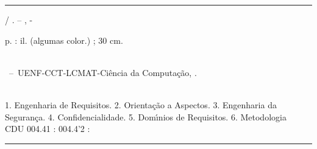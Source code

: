 \documentclass[12pt,oneside,a4paper,english,french,spanish,brazil]{abntex2}
\begin{document}

\frenchspacing

\imprimircapa
\imprimirfolhaderosto*

\begin{fichacatalografica}
	\vspace*{\fill}					%
	\hrule							%
	\begin{center}					%
	\begin{minipage}[c]{12.5cm}		%
	
	\imprimirautor
	
	\hspace{0.5cm} \imprimirtitulo  / \imprimirautor. --
	\imprimirlocal, \imprimirdata-
	
	\hspace{0.5cm} \pageref{LastPage} p. : il. (algumas color.) ; 30 cm.\\
	
	\hspace{0.5cm} \imprimirorientadorRotulo~\imprimirorientador\\
	
	\hspace{0.5cm}
	\parbox[t]{\textwidth}{\imprimirtipotrabalho~--~UENF-CCT-LCMAT-Ci\^{e}ncia da Computa\c{c}\~{a}o,
	\imprimirdata.}\\
	
	\hspace{0.5cm}
		1. Engenharia de Requisitos.
		2. Orienta\c{c}\~{a}o a Aspectos.
		3. Engenharia da Seguran\c{c}a.
		4. Confidencialidade.
		5. Dom\'{\i}nios de Requisitos.
		6. Metodologia\\ 			
	
	\hspace{8.75cm} CDU 004.41 : 004.4'2 : \\  %


	
	\end{minipage}
	\end{center}
	\hrule
\end{fichacatalografica}
\end{document}
